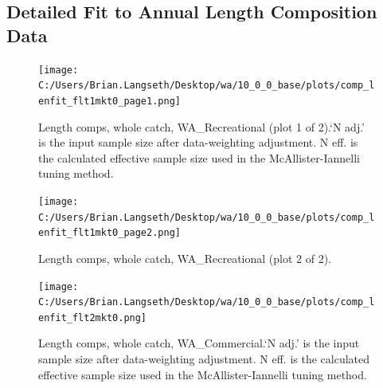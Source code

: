 \documentclass[11pt,
  english,
  letterpaper,
]{article}
\begin{document}

\hypertarget{append_a}{%
\subsection{Detailed Fit to Annual Length Composition Data}\label{append_a}}

\leavevmode\tagmcend\tagstructend


\begin{figure}
\centering
\texttt{[image: C:/Users/Brian.Langseth/Desktop/wa/10\_0\_0\_base/plots/comp\_lenfit\_flt1mkt0\_page1.png]}
\caption{Length comps, whole catch, WA\_Recreational (plot 1 of 2).`N adj.' is the input sample size after data-weighting adjustment. N eff. is the calculated effective sample size used in the McAllister-Iannelli tuning method.\label{fig:comp_lenfit_flt1mkt0_page1}}
\end{figure}

\tagmcend\tagstructend


\begin{figure}
\centering
\texttt{[image: C:/Users/Brian.Langseth/Desktop/wa/10\_0\_0\_base/plots/comp\_lenfit\_flt1mkt0\_page2.png]}
\caption{Length comps, whole catch, WA\_Recreational (plot 2 of 2).\label{fig:comp_lenfit_flt1mkt0_page2}}
\end{figure}

\tagmcend\tagstructend


\begin{figure}
\centering
\texttt{[image: C:/Users/Brian.Langseth/Desktop/wa/10\_0\_0\_base/plots/comp\_lenfit\_flt2mkt0.png]}
\caption{Length comps, whole catch, WA\_Commercial.`N adj.' is the input sample size after data-weighting adjustment. N eff. is the calculated effective sample size used in the McAllister-Iannelli tuning method.\label{fig:comp_lenfit_flt2mkt0}}
\end{figure}

\tagmcend\tagstructend
\end{document}
